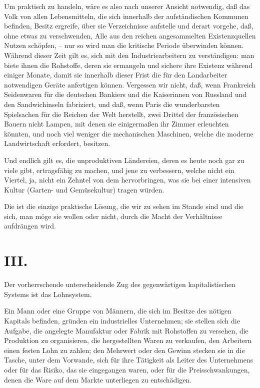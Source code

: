\documentclass{scrbook}
\begin{document}
Um praktisch zu handeln, wäre es also nach unserer Ansicht notwendig, daß das Volk von allen Lebensmitteln, die sich innerhalb der aufständischen Kommunen befinden, Besitz ergreife, über sie Verzeichnisse aufstelle und derart vorgehe, daß, ohne etwas zu verschwenden, Alle aus den reichen angesammelten Existenzquellen Nutzen schöpfen, – nur so wird man die kritische Periode überwinden können. Während dieser Zeit gilt es, sich mit den Industriearbeitern zu verständigen: man biete ihnen die Rohstoffe, deren sie ermangeln und sichere ihre Existenz während einiger Monate, damit sie innerhalb dieser Frist die für den Landarbeiter notwendigen Geräte anfertigen können. Vergessen wir nicht, daß, wenn Frankreich Seidenwaren für die deutschen Bankiers und die Kaiserinnen von Russland und den Sandwichinseln fabriziert, und daß, wenn Paris die wunderbarsten Spielsachen für die Reichen der Welt herstellt, zwei Drittel der französischen Bauern nicht Lampen, mit denen sie einigermaßen ihr Zimmer erleuchten könnten, und noch viel weniger die mechanischen Maschinen, welche die moderne Landwirtschaft erfordert, besitzen.

Und endlich gilt es, die unproduktiven Ländereien, deren es heute noch gar zu viele gibt, ertragsfähig zu machen, und jene zu verbessern, welche nicht ein Viertel, ja, nicht ein Zehntel von dem hervorbringen, was sie bei einer intensiven Kultur (Garten- und Gemüsekultur) tragen würden.

Die ist die einzige praktische Lösung, die wir zu sehen im Stande sind und die sich, man möge sie wollen oder nicht, durch die Macht der Verhältnisse aufdrängen wird.

\section*{III.}

Der vorherrschende unterscheidende Zug des gegenwärtigen kapitalistischen Systems ist das Lohnsystem.

Ein Mann oder eine Gruppe von Männern, die sich im Besitze des nötigen Kapitals befinden, gründen ein industrielles Unternehmen; sie stellen sich die Aufgabe, die angelegte Manufaktur oder Fabrik mit Rohstoffen zu versehen, die Produktion zu organisieren, die hergestellten Waren zu verkaufen, den Arbeitern einen festen Lohn zu zahlen; den Mehrwert oder den Gewinn stecken sie in die Tasche, unter dem Vorwande, sich für ihre Tätigkeit als Leiter des Unternehmens oder für das Risiko, das sie eingegangen waren, oder für die Preisschwankungen, denen die Ware auf dem Markte unterliegen zu entschädigen.
\end{document}

